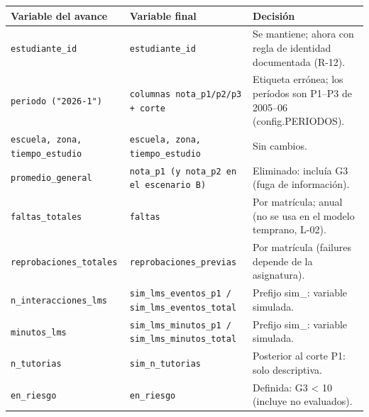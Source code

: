 \begin{tabular}{p{3.6cm}p{4.4cm}p{6.8cm}}
\toprule
Variable del avance & Variable final & Decisión \\
\midrule
\texttt{estudiante\_id} & \texttt{estudiante\_id} & Se mantiene; ahora con regla de identidad documentada (R-12). \\
\texttt{periodo ("2026-1")} & \texttt{columnas nota\_p1/p2/p3 + corte} & Etiqueta errónea; los períodos son P1–P3 de 2005–06 (config.PERIODOS). \\
\texttt{escuela, zona, tiempo\_estudio} & \texttt{escuela, zona, tiempo\_estudio} & Sin cambios. \\
\texttt{promedio\_general} & \texttt{nota\_p1 (y nota\_p2 en el escenario B)} & Eliminado: incluía G3 (fuga de información). \\
\texttt{faltas\_totales} & \texttt{faltas} & Por matrícula; anual (no se usa en el modelo temprano, L-02). \\
\texttt{reprobaciones\_totales} & \texttt{reprobaciones\_previas} & Por matrícula (failures depende de la asignatura). \\
\texttt{n\_interacciones\_lms} & \texttt{sim\_lms\_eventos\_p1 / sim\_lms\_eventos\_total} & Prefijo sim\_: variable simulada. \\
\texttt{minutos\_lms} & \texttt{sim\_lms\_minutos\_p1 / sim\_lms\_minutos\_total} & Prefijo sim\_: variable simulada. \\
\texttt{n\_tutorias} & \texttt{sim\_n\_tutorias} & Posterior al corte P1: solo descriptiva. \\
\texttt{en\_riesgo} & \texttt{en\_riesgo} & Definida: G3 < 10 (incluye no evaluados). \\
\bottomrule
\end{tabular}
